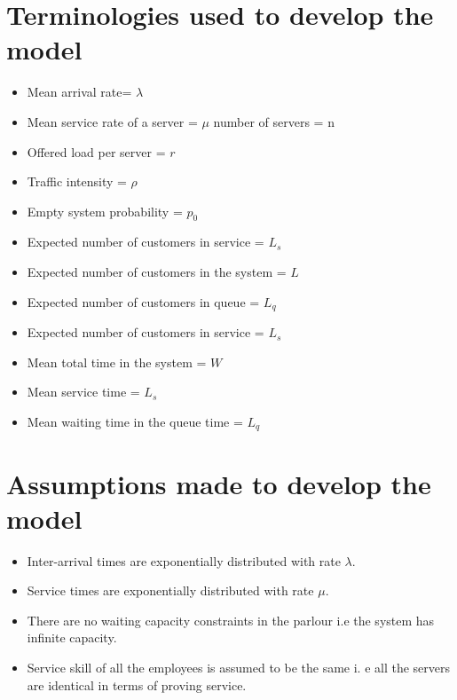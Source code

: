 \documentclass{article}
\theoremstyle{definition}
\begin{document}
\section{Terminologies used to develop the model}
\begin{itemize}
\item Mean arrival rate= $ \lambda $ 
\item Mean service rate of a server =  $\mu$ 
number of servers = n
\item Offered load per server = $r$
\item Traffic intensity = $ \rho $
\item Empty system probability = $ p_{0} $
\item Expected number of customers in service = $ L_{s} $
\item Expected number of customers in the system = $ L $
\item Expected number of customers in queue = $ L_{q} $
\item Expected number of customers in service = $ L_{s} $
\item Mean total time in the system = $ W $
\item Mean service time = $ L_{s} $
\item Mean waiting time in the queue time = $ L_{q} $
\end{itemize}

\section{Assumptions made to develop the model}
\begin{itemize}
\item Inter-arrival times are exponentially distributed with rate $\lambda$.
\item Service times are exponentially distributed with rate $\mu$.
\item There are no waiting capacity constraints in the parlour i.e the system has infinite capacity.
\item Service skill of all the employees is assumed to be the same i. e all the servers are identical in terms of proving service.
\end{itemize}	
\end{document}
